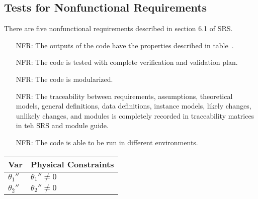 \documentclass[12pt, titlepage]{article}
\newcounter{reqnum} %
\begin{document}

  
\subsection{Tests for Nonfunctional Requirements}

There are five nonfunctional requirements described in section 6.1 of SRS.

\noindent \begin{itemize}

\item[NFR\refstepcounter{reqnum}\thereqnum \label{NFR_Correct}:] 
The outputs of the code have the properties described in table~.
\item[NFR\refstepcounter{reqnum}\thereqnum \label{NFR_Verifiable}:]  
The code is tested with complete verification and validation plan.
\item[NFR\refstepcounter{reqnum}\thereqnum \label{NFR_Reusable}:]
The code is modularized. 
\item[NFR\refstepcounter{reqnum}\thereqnum \label{NFR_Maintainable}:] The
  traceability between requirements, assumptions, theoretical models, general
  definitions, data definitions, instance models, likely changes, unlikely
  changes, and modules is completely recorded in traceability matrices in teh
  SRS and module guide.
\item[NFR\refstepcounter{reqnum}\thereqnum \label{NFR_Portable}:]
The code is able to be run in different environments. 
\end{itemize}

\begin{table}[H]
\caption{Output Variables} \label{TblOutputVar}
\renewcommand{\arraystretch}{1.2}
\noindent \begin{longtable*}{l l} 
  \toprule
  \textbf{Var} & \textbf{Physical Constraints} \\
  \midrule 
  ${\theta_1}''$ & ${\theta_1}'' \neq 0$\\
  ${\theta_2}''$ & ${\theta_2}'' \neq 0$\\
  \bottomrule
\end{longtable*}
\end{table}
\end{document}
